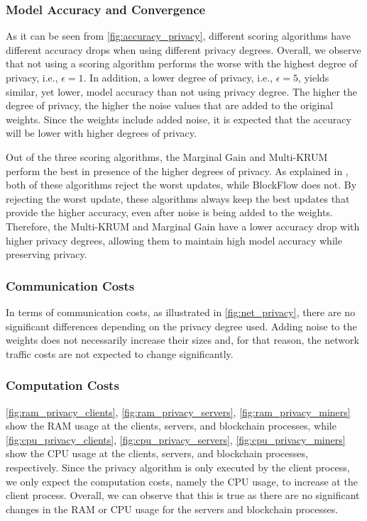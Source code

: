 \subsubsection{Model Accuracy and Convergence}

As it can be seen from \autoref{fig:accuracy_privacy}, different scoring algorithms have different accuracy drops when using different privacy degrees. Overall, we observe that not using a scoring algorithm performs the worse with the highest degree of privacy, i.e., $\epsilon = 1$. In addition, a lower degree of privacy, i.e., $\epsilon = 5$, yields similar, yet lower, model accuracy than not using privacy degree. The higher the degree of privacy, the higher the noise values that are added to the original weights. Since the weights include added noise, it is expected that the accuracy will be lower with higher degrees of privacy.

Out of the three scoring algorithms, the Marginal Gain and Multi-KRUM perform the best in presence of the higher degrees of privacy. As explained in , both of these algorithms reject the worst updates, while BlockFlow does not. By rejecting the worst update, these algorithms always keep the best updates that provide the higher accuracy, even after noise is being added to the weights. Therefore, the Multi-KRUM and Marginal Gain have a lower accuracy drop with higher privacy degrees, allowing them to maintain high model accuracy while preserving privacy.

\subsubsection{Communication Costs}

In terms of communication costs, as illustrated in \autoref{fig:net_privacy}, there are no significant differences depending on the privacy degree used. Adding noise to the weights does not necessarily increase their sizes and, for that reason, the network traffic costs are not expected to change significantly.

\subsubsection{Computation Costs}

\autoref{fig:ram_privacy_clients}, \autoref{fig:ram_privacy_servers}, \autoref{fig:ram_privacy_miners} show the RAM usage at the clients, servers, and blockchain processes, while \autoref{fig:cpu_privacy_clients}, \autoref{fig:cpu_privacy_servers}, \autoref{fig:cpu_privacy_miners} show the CPU usage at the clients, servers, and blockchain processes, respectively. Since the privacy algorithm is only executed by the client process, we only expect the computation costs, namely the CPU usage, to increase at the client process. Overall, we can observe that this is true as there are no significant changes in the RAM or CPU usage for the servers and blockchain processes.

